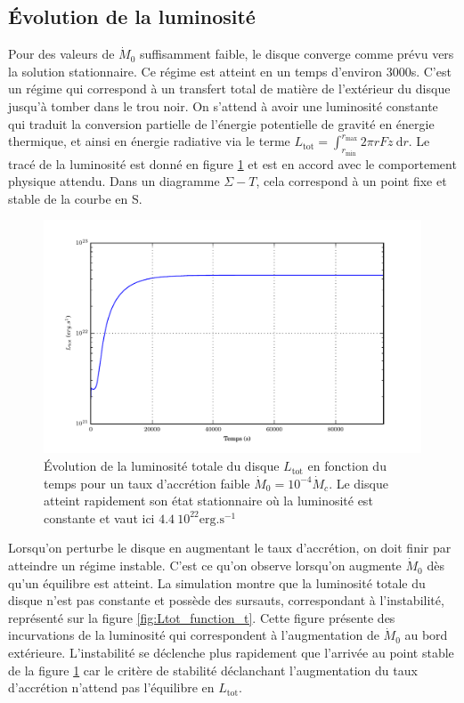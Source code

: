 \subsection{Évolution de la luminosité}

Pour des valeurs de $\dot{M}_0$ suffisamment faible, le disque converge comme prévu vers la solution stationnaire. Ce régime est atteint en un temps d'environ 3000s. C'est un régime qui correspond à un transfert total de matière de l'extérieur du disque jusqu'à tomber dans le trou noir. On s'attend à avoir une luminosité constante qui traduit la conversion partielle de l'énergie potentielle de gravité en énergie thermique, et ainsi en énergie radiative via le terme $L_\mathrm{tot} = \int_{r_\mathrm{min}}^{r_\mathrm{max}} 2\pi r Fz\ \mathrm{d}r$. Le tracé de la luminosité est donné en figure \ref{fig:Lstable} et est en accord avec le comportement physique attendu. Dans un diagramme $\Sigma-T$, cela correspond à un point fixe et stable de la courbe en S.

\begin{figure}
  \includegraphics{figures/Ltot_fonction_t_stable.pdf}
  \caption{Évolution de la luminosité totale du disque $L_\mathrm{tot}$ en fonction du temps pour un taux d'accrétion faible $\dot{M}_0 = 10^{-4}\dot{M}_c$. Le disque atteint rapidement son état stationnaire où la luminosité est constante et vaut ici $4.4\ 10^{22}\mathrm{erg.s^{-1}}$}
  \label{fig:Lstable}
\end{figure}

Lorsqu'on perturbe le disque en augmentant le taux d'accrétion, on doit finir par atteindre un régime instable. C'est ce qu'on observe lorsqu'on augmente $\dot{M}_0$ dès qu'un équilibre est atteint. La simulation montre que la luminosité totale du disque n'est pas constante et possède des sursauts, correspondant à l'instabilité, représenté sur la figure \ref{fig:Ltot_function_t}. Cette figure présente des incurvations de la luminosité qui correspondent à l'augmentation de $\dot{M}_0$ au bord extérieure. L'instabilité se déclenche plus rapidement que l'arrivée au point stable de la figure \ref{fig:Lstable} car le critère de stabilité déclanchant l'augmentation du taux d'accrétion n'attend pas l'équilibre en $L_\mathrm{tot}$.

